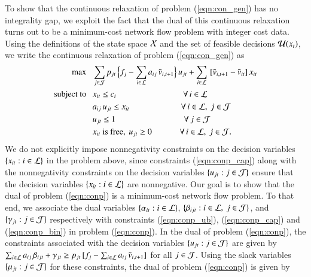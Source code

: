 To show that the continuous relaxation of problem (\ref{eqn:con_gen}) has no integrality gap, we exploit the fact that the dual of this continuous relaxation turns out to be a minimum-cost network flow problem with integer cost data. Using the definitions of the state space ${\cal X}$ and the set of feasible decisions ${\cal U}(x_t)$, we write the continuous relaxation of problem (\ref{eqn:con_gen}) as
%
%
\begin{subequations}
\label{eqn:conp}
\begin{align}
\max~~~ & 
\sum_{j \in {\cal J}} p_{jt} {\,} \Big\{ f_j - \sum_{i \in {\cal L}} a_{ij} {\,} {\tilde v}_{i,t+1} \Big\} {\,} u_{jt}
+
\sum_{i \in {\cal L}}  {\,} [ {\tilde v}_{i,t+1} - {\tilde v}_{it} ] {\,} x_{it}
\label{eqn:conp_obj}
\\
\mbox{subject to} ~~~ 
& x_{it} \leq c_i \qquad \qquad \qquad \qquad \forall {\,} i \in {\cal L}
\label{eqn:conp_ub}
\\
& a_{ij} {\,} u_{jt} \leq x_{it} \qquad \qquad \qquad {\,} \forall {\,} i \in {\cal L},~ j \in {\cal J}
\label{eqn:conp_cap}
\\
& u_{jt} \leq 1 \qquad \qquad \qquad \qquad {\,} \forall {\,}  j \in {\cal J}
\label{eqn:conp_bin}
\\
& x_{it} \mbox{ is free},~ u_{jt} \geq 0  \qquad \quad {\,} {\,} \forall {\,} i \in {\cal L},~ j \in {\cal J}. 
\label{eqn:conp_e}
\end{align}
\end{subequations}
%
%
We do not explicitly impose nonnegativity constraints on the decision variables $\{ x_{it} : i \in {\cal L} \}$ in the problem above, since 
constraints (\ref{eqn:conp_cap}) along with the nonnegativity constraints on the decision variables $\{ u_{jt} : j \in {\cal J}\}$ ensure that the decision variables $\{ x_{it} : i \in {\cal L} \}$ are nonnegative.  Our goal is to show that the dual of problem (\ref{eqn:conp}) is a minimum-cost network flow problem. To that end, we associate the dual variables $\{ \alpha_{it} : i \in {\cal L}\}$, $\{ \beta_{ijt} : i \in {\cal L},~ j \in {\cal J}\}$,  and $\{ \gamma_{jt} : j \in {\cal J}\}$ respectively with constraints (\ref{eqn:conp_ub}), (\ref{eqn:conp_cap}) and (\ref{eqn:conp_bin}) in problem (\ref{eqn:conp}). In the dual of problem (\ref{eqn:conp}), the constraints associated with the decision variables $\{ u_{jt} : j \in {\cal J}\} $  are given by  $\sum_{i \in {\cal L}} a_{ij} {\,} \beta_{ijt} + \gamma_{jt} \geq p_{jt} {\,}  [f_j - \sum_{i \in {\cal L}} a_{ij} {\,} {\tilde v}_{i,t+1} ]$ for all $j \in {\cal J}$. Using the slack variables $\{ \mu_{jt} : j \in {\cal J}\}$ for these constraints, the dual of problem (\ref{eqn:conp}) is given by 
